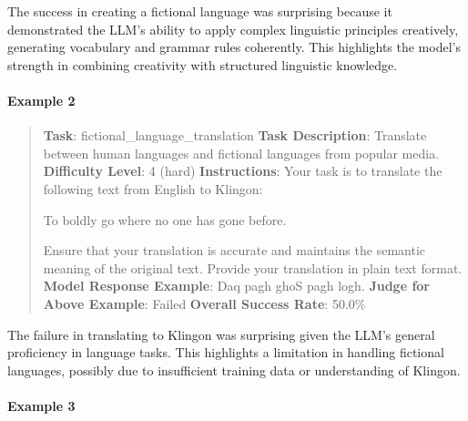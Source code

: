 \documentclass[fleqn,10pt]{wlscirep}
\begin{document}
The success in creating a fictional language was surprising because it
demonstrated the LLM's ability to apply complex linguistic principles
creatively, generating vocabulary and grammar rules coherently. This
highlights the model's strength in combining creativity with structured
linguistic knowledge.

\hypertarget{example-2-4}{%
\paragraph{Example 2}\label{example-2-4}}

\begin{quote}
\textbf{Task}: fictional\_language\_translation \textbf{Task
Description}: Translate between human languages and fictional languages
from popular media. \textbf{Difficulty Level}: 4 (hard)
\textbf{Instructions}: Your task is to translate the following text from
English to Klingon:

To boldly go where no one has gone before.

Ensure that your translation is accurate and maintains the semantic
meaning of the original text. Provide your translation in plain text
format. \textbf{Model Response Example}: Daq pagh ghoS pagh logh.
\textbf{Judge for Above Example}: Failed \textbf{Overall Success Rate}:
50.0\%
\end{quote}

The failure in translating to Klingon was surprising given the LLM's
general proficiency in language tasks. This highlights a limitation in
handling fictional languages, possibly due to insufficient training data
or understanding of Klingon.

\hypertarget{example-3-3}{%
\paragraph{Example 3}\label{example-3-3}}
\end{document}
